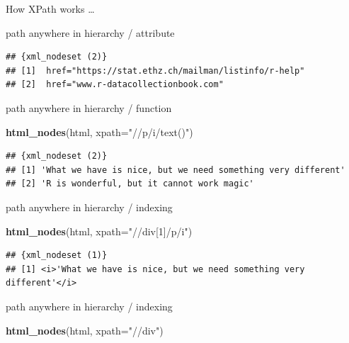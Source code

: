 \documentclass[ignorenonframetext,]{beamer}
\newenvironment{Shaded}{\begin{snugshade}}{\end{snugshade}}
\newcommand{\KeywordTok}[1]{\textcolor[rgb]{0.13,0.29,0.53}{\textbf{{#1}}}}
\newcommand{\DataTypeTok}[1]{\textcolor[rgb]{0.13,0.29,0.53}{{#1}}}
\newcommand{\StringTok}[1]{\textcolor[rgb]{0.31,0.60,0.02}{{#1}}}
\newcommand{\NormalTok}[1]{{#1}}
\begin{document}
\begin{frame}[fragile]{How XPath works \ldots{}}
\begin{block}{path anywhere in hierarchy / attribute}
\begin{verbatim}
## {xml_nodeset (2)}
## [1]  href="https://stat.ethz.ch/mailman/listinfo/r-help"
## [2]  href="www.r-datacollectionbook.com"
\end{verbatim}

\end{block}

\begin{block}{path anywhere in hierarchy / function}

\begin{Shaded}
\begin{Highlighting}[]
\KeywordTok{html_nodes}\NormalTok{(html, }\DataTypeTok{xpath=}\StringTok{"//p/i/text()"}\NormalTok{)}
\end{Highlighting}
\end{Shaded}

\begin{verbatim}
## {xml_nodeset (2)}
## [1] 'What we have is nice, but we need something very different'
## [2] 'R is wonderful, but it cannot work magic'
\end{verbatim}

\end{block}

\begin{block}{path anywhere in hierarchy / indexing}

\begin{Shaded}
\begin{Highlighting}[]
\KeywordTok{html_nodes}\NormalTok{(html, }\DataTypeTok{xpath=}\StringTok{"//div[1]/p/i"}\NormalTok{)}
\end{Highlighting}
\end{Shaded}

\begin{verbatim}
## {xml_nodeset (1)}
## [1] <i>'What we have is nice, but we need something very different'</i>
\end{verbatim}

\end{block}

\begin{block}{path anywhere in hierarchy / indexing}

\begin{Shaded}
\begin{Highlighting}[]
\KeywordTok{html_nodes}\NormalTok{(html, }\DataTypeTok{xpath=}\StringTok{"//div"}\NormalTok{)}
\end{Highlighting}
\end{Shaded}


\end{block}
\end{frame}
\end{document}
